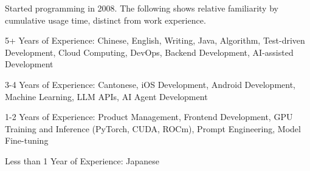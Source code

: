 

\begin{cventry}
    {} %
    {} %
    {} %
    {} %
    {
        \begin{cvitems}
            \item {Started programming in 2008. The following shows relative familiarity by cumulative usage time, distinct from work experience.}
            \item {5+ Years of Experience: Chinese, English, Writing, Java, Algorithm, Test-driven Development, Cloud Computing, DevOps, Backend Development, AI-assisted Development}
            \item {3-4 Years of Experience: Cantonese, iOS Development, Android Development, Machine Learning, LLM APIs, AI Agent Development}
            \item {1-2 Years of Experience: Product Management, Frontend Development, GPU Training and Inference (PyTorch, CUDA, ROCm), Prompt Engineering, Model Fine-tuning}
            \item {Less than 1 Year of Experience: Japanese}
        \end{cvitems}
    }
\end{cventry}
